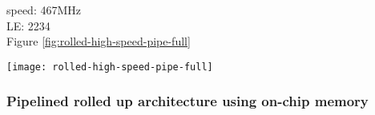 speed: 467MHz\\
LE: 2234\\
Figure \ref{fig:rolled-high-speed-pipe-full}


\begin{sidewaysfigure}[!h]
\centering
\texttt{[image: rolled-high-speed-pipe-full]}
\caption{Modified pipeline for pipelined rolled up architecture}
\label{fig:rolled-high-speed-pipe-full}
\end{sidewaysfigure}


\subsubsection{Pipelined rolled up architecture using on-chip memory}
